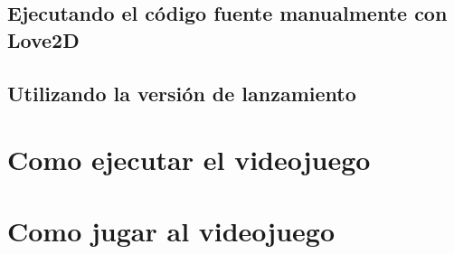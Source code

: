 \documentclass[12pt, spanish]{article}
\begin{document}
\subsection{Ejecutando el código fuente manualmente con Love2D}

\subsection{Utilizando la versión de lanzamiento}


\section{Como ejecutar el videojuego}

\section{Como jugar al videojuego}
\end{document}

